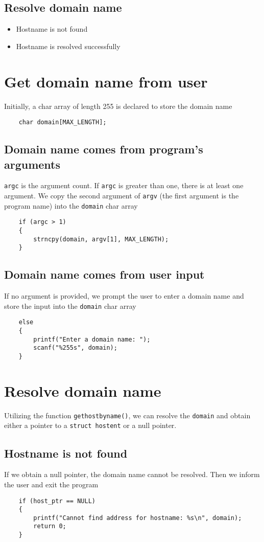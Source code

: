 \documentclass[12pt]{article}
\begin{document}
\subsection{Resolve domain name}
\begin{itemize}
    \item Hostname is not found
    \item Hostname is resolved successfully
\end{itemize}

\section{Get domain name from user}
Initially, a char array of length 255 is declared to store the domain name
\begin{verbatim}
    char domain[MAX_LENGTH];
\end{verbatim}

\subsection{Domain name comes from program's arguments}
\Verb"argc" is the argument count. If \Verb"argc" is greater than one, there is at least one argument. We copy the second argument of \Verb"argv" (the first argument is the program name) into the \Verb"domain" char array
\begin{verbatim}
    if (argc > 1)
    {
        strncpy(domain, argv[1], MAX_LENGTH);
    }\end{verbatim}

\subsection{Domain name comes from user input}
If no argument is provided, we prompt the user to enter a domain name and store the input into the \Verb"domain" char array
\begin{verbatim}
    else
    {
        printf("Enter a domain name: ");
        scanf("%255s", domain);
    }
\end{verbatim}
\clearpage

\section{Resolve domain name}
Utilizing the function \Verb"gethostbyname()", we can resolve the \Verb"domain" and obtain either a pointer to a \Verb"struct hostent" or a null pointer.
\subsection{Hostname is not found}
If we obtain a null pointer, the domain name cannot be resolved. Then we inform the user and exit the program
\begin{verbatim}
    if (host_ptr == NULL)
    {
        printf("Cannot find address for hostname: %s\n", domain);
        return 0;
    }
\end{verbatim}
\end{document}
